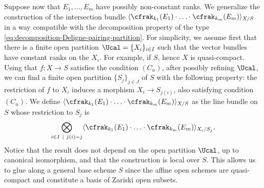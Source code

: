 Suppose now that $E_{1},\ldots, E_{m}$ have possibly non-constant ranks. We generalize the construction of the intersection bundle $\langle \cfrak_{k_{1}}(E_{1})\cdot\ldots \cdot \cfrak_{k_{m}}(E_{m})\rangle_{X/S}$ in a way compatible with the decomposition property of the type \eqref{eq:decomposition-Deligne-pairing-partition}. For simplicity, we assume first that there is a finite open partition $\Ucal=\lbrace X_{i}\rbrace_{i\in I}$ such that the vector bundles have constant ranks on the $X_{i}$. For example, if $S$, hence $X$ is quasi-compact. Using that $f\colon X\to S$ satisfies the condition $(C_{n})$, after possibly refining $\Ucal$, we can find a finite open partition $\lbrace S_{j}\rbrace_{j\in J}$ of $S$ with the following property: the restriction of $f$ to $X_{i}$ induces a morphism $X_{i}\to S_{j(i)}$, also satisfying condition $(C_{n})$. We define $\langle \cfrak_{k_{1}}(E_{1})\cdot\ldots \cdot \cfrak_{k_{m}}(E_{m})\rangle_{X/S}$ as the line bundle on $S$ whose restriction to $S_{j}$ is\vspace*{-3pt}
\begin{equation}\label{eq:def-intersection-bundle-open-partitions}
\bigotimes_{i\in I\ \mid\ j(i)=j}\langle \cfrak_{k_{1}}(E_{1})\cdot\ldots \cdot \cfrak_{k_{m}}(E_{m})\rangle_{X_{i}/S_{j}}.
\end{equation}
Notice that the result does not depend on the open partition $\Ucal$, up to canonical isomorphism, and that the construction is local over $S$. This allows us to glue along a general base scheme $S$ since the affine open schemes are quasi-compact and constitute a basis of Zariski open subsets.

